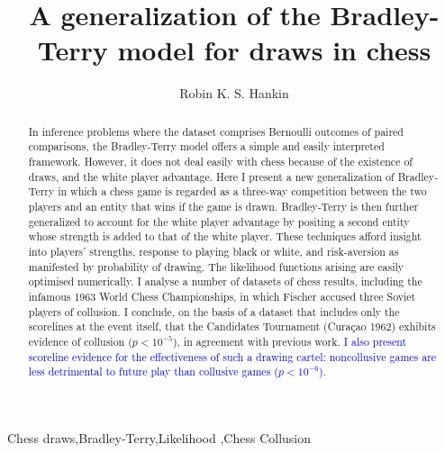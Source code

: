 \documentclass[review]{elsarticle}
\begin{document}
\begin{frontmatter}

\title{A generalization of the Bradley-Terry model for draws in chess}

\author{Robin K. S. Hankin}
\address{AUT University, 2-14 Wakefield Street, Auckland, New Zealand}


\begin{abstract}
In inference problems where the dataset comprises Bernoulli outcomes
of paired comparisons, the Bradley-Terry model offers a simple and
easily interpreted framework.  However, it does not deal easily with
chess because of the existence of draws, and the white player
advantage.  Here I present a new generalization of Bradley-Terry in
which a chess game is regarded as a three-way competition between the
two players and an entity that wins if the game is drawn.
Bradley-Terry is then further generalized to account for the white
player advantage by positing a second entity whose strength is added
to that of the white player.  These techniques afford insight into
players' strengths, response to playing black or white, and
risk-aversion as manifested by probability of drawing.  The likelihood
functions arising are easily optimised numerically.  I analyse a
number of datasets of chess results, including the infamous 1963 World
Chess Championships, in which Fischer accused three Soviet players of
collusion.  I conclude, on the basis of a dataset that includes only
the scorelines at the event itself, that the Candidates Tournament
(Cura\c{c}ao 1962) exhibits evidence of collusion ($p<10^{-5}$), in
agreement with previous work.  \textcolor{blue}{I also present
  scoreline evidence for the effectiveness of such a drawing cartel:
  noncollusive games are less detrimental to future play than
  collusive games ($p<10^{-6}$).}
\end{abstract}

\begin{keyword}
  Chess draws\sep Bradley-Terry\sep Likelihood \sep Chess Collusion
\end{keyword}

\end{frontmatter}

\linenumbers

\newcommand\headercell[1]{%
   \smash[b]{\begin{tabular}[t]{@{}c@{}} #1 \end{tabular}}}
\newcommand{\draw}{\ensuremath{\mathfrak{D}}}
\newcommand{\cdraw}{\ensuremath{\mathfrak{C}}}
\newcommand{\white}{\ensuremath{\mathfrak{W}}}
\newcommand{\Prob}{\operatorname{Prob}}
\end{document}
